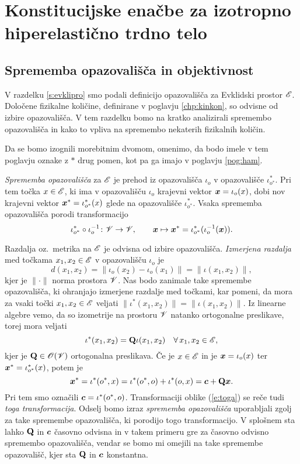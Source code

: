 \appendix

\chapter{Konstitucijske enačbe za izotropno hiperelastično trdno telo}


\section{Sprememba opazovališča in objektivnost}


V razdelku \ref{s:evklipro} smo podali definicijo opazovališča za Evklidski
prostor $\mathscr E$. Določene fizikalne količine, definirane v poglavju \ref{chp:kinkon},
so odvisne od izbire opazovališča. V tem razdelku bomo na kratko analizirali spremembo opazovališča
in kako to vpliva na spremembo nekaterih fizikalnih količin.

Da se bomo izognili morebitnim dvomom, omenimo, da bodo imele
v tem poglavju oznake z $*$ drug pomen, kot pa ga imajo v poglavju \ref{pog:ham}.

\emph{Sprememba opazovališča} za $\mathscr E$ je prehod iz opazovališča $\iota_o$ v opazovališče
$\iota^*_{o^*}$. Pri tem točka $x\in\mathscr E$, ki ima v opazovališču $\iota_o$ krajevni vektor
$\boldsymbol x=\iota_o(x)$, dobi nov krajevni vektor $\boldsymbol x^*=\iota^*_{o^*}(x)$ glede na opazovališče
$\iota^*_{o^*}$. Vsaka sprememba opazovališča porodi transformacijo
\[
	\iota^*_{o^*}\circ\iota_o^{-1}\colon\mathscr V\to\mathscr V,\qquad
	\boldsymbol x\mapsto\boldsymbol x^*=\iota^*_{o^*}(\iota_o^{-1}(\boldsymbol x)).
\]

Razdalja oz.~metrika na $\mathscr E$ je odvisna od izbire opazovališča. \emph{Izmerjena razdalja} med točkama
$x_1,x_2\in\mathscr E$ v opazovališču $\iota_o$ je
\[ d(x_1,x_2)=\|\iota_o(x_2)-\iota_o(x_1)\|=\|\iota(x_1,x_2)\|, \]
kjer je $\|\cdot\|$ norma prostora $\mathscr V$. Nas bodo zanimale take
spremembe opazovališča, ki ohranjajo izmerjene razdalje med točkami, kar pomeni,
da mora za vsaki točki $x_1,x_2\in\mathscr E$ veljati
$\|\iota^*(x_1,x_2)\|=\|\iota(x_1,x_2)\|$.
Iz linearne algebre vemo, da so izometrije na prostoru $\mathscr V$ natanko ortogonalne preslikave,
torej mora veljati
\begin{equation} \label{e:vektrans}
	\iota^*(x_1,x_2)=\mathbf Q\iota(x_1,x_2)\quad\forall\, x_1,x_2\in\mathscr E,
\end{equation}
kjer je $\mathbf Q\in\mathscr{O}(\mathscr V)$ ortogonalna preslikava. Če je $x\in\mathscr E$ in
je $\boldsymbol x=\iota_o(x)$ ter $\boldsymbol x^*=\iota^*_{o^*}(x)$, potem je
\begin{equation} \label{e:toga}
	\boldsymbol x^*=\iota^*(o^*,x)=\iota^*(o^*,o)+\iota^*(o,x)=\boldsymbol c+\mathbf Q\boldsymbol x.
\end{equation}
Pri tem smo označili $\boldsymbol c=\iota^*(o^*,o)$. Transformaciji oblike (\ref{e:toga})
se reče tudi \emph{toga transformacija}. Odselj bomo izraz \textit{sprememba opazovališča}
uporabljali zgolj za take spremembe opazovališča, ki porodijo togo transformacijo.
V splošnem sta lahko $\mathbf Q$ in $\boldsymbol c$ časovno odvisna in v takem primeru
gre za časovno odvisno spremembo opazovališča, vendar se bomo mi omejili na
take spremembe opazovališč, kjer sta $\mathbf Q$ in $\boldsymbol c$ konstantna.

